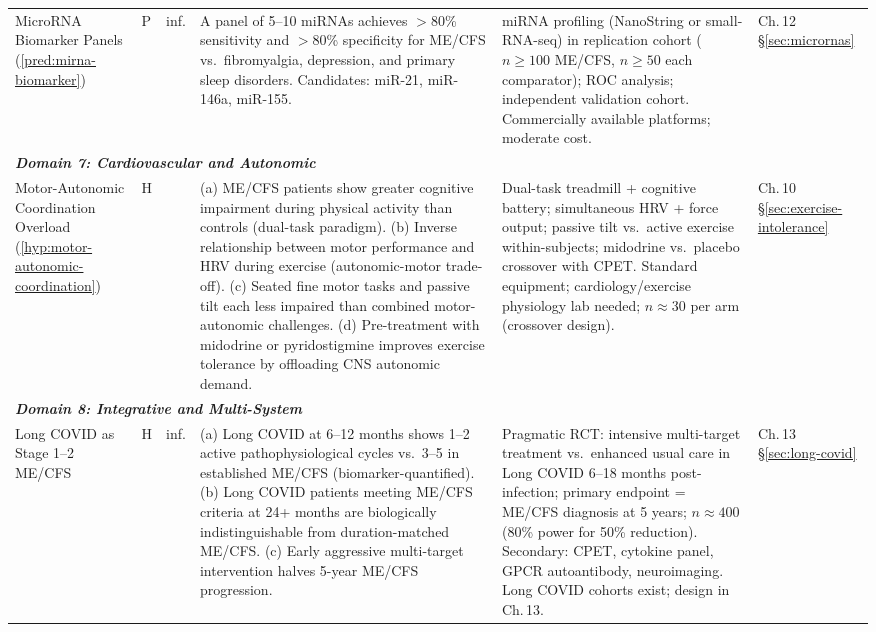 \begin{longtable}{%
  p{3.0cm}
  >{\centering\arraybackslash}p{0.55cm}
  >{\centering\arraybackslash}p{1.0cm}
  p{3.8cm}
  p{3.8cm}
  p{2.2cm}
}
MicroRNA Biomarker Panels
(\ref{pred:mirna-biomarker})
&
P & inf.
&
A panel of 5--10 miRNAs achieves $>$80\% sensitivity and $>$80\% specificity
for ME/CFS vs.\ fibromyalgia, depression, and primary sleep disorders.
Candidates: miR-21, miR-146a, miR-155.
&
miRNA profiling (NanoString or small-RNA-seq) in replication cohort
($n \geq 100$ ME/CFS, $n \geq 50$ each comparator);
ROC analysis; independent validation cohort.
Commercially available platforms; moderate cost.
&
Ch.\,12 \S\ref{sec:micrornas} \\[6pt]

\multicolumn{6}{l}{\small\textit{\textbf{Domain 7: Cardiovascular and Autonomic}}} \\[2pt]

Motor-Autonomic Coordination Overload
(\ref{hyp:motor-autonomic-coordination})
&
H & 0.55
&
(a) ME/CFS patients show greater cognitive impairment during physical activity
than controls (dual-task paradigm).
(b) Inverse relationship between motor performance and HRV during exercise
(autonomic-motor trade-off).
(c) Seated fine motor tasks and passive tilt each less impaired than combined
motor-autonomic challenges.
(d) Pre-treatment with midodrine or pyridostigmine improves exercise tolerance
by offloading CNS autonomic demand.
&
Dual-task treadmill + cognitive battery; simultaneous HRV + force output;
passive tilt vs.\ active exercise within-subjects;
midodrine vs.\ placebo crossover with CPET.
Standard equipment; cardiology/exercise physiology lab needed;
$n \approx 30$ per arm (crossover design).
&
Ch.\,10 \S\ref{sec:exercise-intolerance} \\[6pt]

\multicolumn{6}{l}{\small\textit{\textbf{Domain 8: Integrative and Multi-System}}} \\[2pt]

Long COVID as Stage 1--2 ME/CFS
&
H & inf.
&
(a) Long COVID at 6--12 months shows 1--2 active pathophysiological cycles vs.\
3--5 in established ME/CFS (biomarker-quantified).
(b) Long COVID patients meeting ME/CFS criteria at 24+ months are biologically
indistinguishable from duration-matched ME/CFS.
(c) Early aggressive multi-target intervention halves 5-year ME/CFS progression.
&
Pragmatic RCT: intensive multi-target treatment vs.\ enhanced usual care
in Long COVID 6--18 months post-infection;
primary endpoint = ME/CFS diagnosis at 5 years;
$n \approx 400$ (80\% power for 50\% reduction).
Secondary: CPET, cytokine panel, GPCR autoantibody, neuroimaging.
Long COVID cohorts exist; design in Ch.\,13.
&
Ch.\,13 \S\ref{sec:long-covid} \\[6pt]

\end{longtable}

